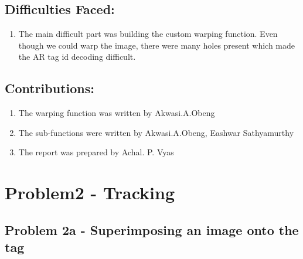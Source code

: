 \documentclass[12pt]{article}
\begin{document}
\subsection{Difficulties Faced:}
\begin{enumerate}
\item The main difficult part was building the custom warping function. Even though we could warp the image, there were many holes present which made the AR tag id decoding difficult.
\end{enumerate}
\subsection{Contributions:}
\begin{enumerate}
\item The warping function was written by Akwasi.A.Obeng
\item The sub-functions were written by Akwasi.A.Obeng, Eashwar Sathyamurthy 
\item The report was prepared by Achal. P. Vyas

\end{enumerate}


\section{Problem2 - Tracking}
\subsection{Problem 2a - Superimposing an image onto the tag}
\end{document}

